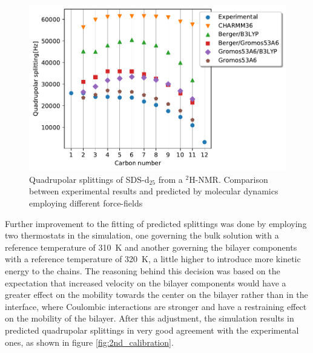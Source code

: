 \documentclass[3p,preprint,review]{elsarticle}
\begin{document}
	\begin{figure}[h]
		\centering
		\includegraphics[width=\columnwidth]{calibration}
		\caption{Quadrupolar splittings of SDS-d$_{25}$ from a $^2$H-NMR. Comparison
			between experimental results and predicted by molecular dynamics employing
			different force-fields}
		\label{fig:calibration}
	\end{figure}
	
	Further improvement to the fitting of predicted splittings was done by
	employing
	two thermostats in the simulation, one governing the bulk solution with a
	reference temperature of \SI{310}{K} and another governing the bilayer
	components with a reference temperature of \SI{320}{K}, a little higher to
	introduce more kinetic energy to the chains. The reasoning behind
	this decision was based on the expectation that increased velocity on the
	bilayer components would have a greater effect on the mobility towards the
	center on the bilayer rather than in the interface, where Coulombic
	interactions
	are stronger and have a restraining effect on the mobility of the bilayer.
	After
	this adjustment, the simulation results in predicted quadrupolar splittings in
	very good agreement with the experimental ones, as shown in figure
	\ref{fig:2nd_calibration}.
	
\end{document}
